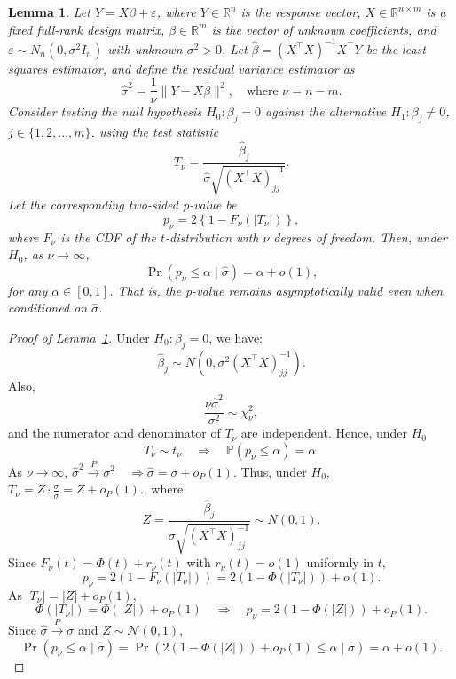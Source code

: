 \documentclass[10pt,a4paper]{amsart}
\newtheorem{lemma}{Lemma}
\begin{document}
\begin{lemma}
\label{lem:asymptotic_pval}
Let $Y=X\beta+\varepsilon$, where $Y\in \mathbb{R}^n$ is the response vector, $X \in \mathbb{R}^{n \times m}$ is a fixed full-rank design matrix, $\beta \in \mathbb{R}^m$ is the vector of unknown coefficients, and $\varepsilon \sim N_n(0, \sigma^2 I_n)$ with unknown $\sigma^2 > 0$. Let $\hat{\beta} = (X^\top X)^{-1}X^\top Y$ be the least squares estimator, and define the residual variance estimator as
\[
\hat{\sigma}^2 = \frac{1}{\nu} \|Y - X\hat{\beta}\|^2, \quad \text{where } \nu = n - m.
\]
Consider testing the null hypothesis $H_0: \beta_j = 0$ against the alternative $H_1: \beta_j \neq 0$, $j\in \{1,2,...,m\}$, using the test statistic
\[
T_\nu = \frac{\hat{\beta}_j}{\hat{\sigma} \sqrt{(X^\top X)^{-1}_{jj}}}.
\]
Let the corresponding two-sided \textit{p}-value be
\[
p_\nu = 2\left\{1 - F_\nu\left(|T_\nu|\right)\right\},
\]
where $F_\nu$ is the CDF of the $t$-distribution with $\nu$ degrees of freedom. Then, under $H_0$, as $\nu \to \infty$,
\[
\Pr(p_\nu \leq \alpha \mid \hat{\sigma}) = \alpha + o(1),
\]
for any $\alpha \in [0, 1]$. That is, the \textit{p}-value remains asymptotically valid even when conditioned on $\hat{\sigma}$.
\end{lemma}

\begin{proof}[Proof of Lemma~\ref{lem:asymptotic_pval}]

Under $H_0: \beta_j = 0$, we have:
\[
\hat{\beta}_j \sim N\left(0, \sigma^2 (X^\top X)^{-1}_{jj}\right).
\]
Also,
\[
\frac{\nu \hat{\sigma}^2}{\sigma^2} \sim \chi^2_\nu,
\]
and the numerator and denominator of $T_\nu$ are independent. Hence, under $H_0$
\[
T_\nu \sim t_\nu \quad \Rightarrow \quad \mathbb{P}(p_\nu \leq \alpha) = \alpha.
\]
As $\nu \to \infty$, 
\(
\hat{\sigma}^2 \xrightarrow{P} \sigma^2 \quad \Rightarrow \hat{\sigma} = \sigma + o_P(1)
\).
Thus, under $H_0$, \(
T_\nu = Z \cdot \frac{\sigma}{\hat{\sigma}} = Z + o_P(1).
\), where
\[
Z = \frac{\hat{\beta}_j}{\sigma \sqrt{(X^\top X)^{-1}_{jj}}} \sim N(0,1).
\]
Since $F_\nu(t) = \Phi(t) + r_\nu(t)$ with $r_\nu(t) = o(1)$ uniformly in $t$,
\[
p_\nu = 2(1 - F_\nu(|T_\nu|)) = 2(1 - \Phi(|T_\nu|)) + o(1).
\]
As $|T_\nu| = |Z| + o_P(1)$,
\[
\Phi(|T_\nu|) = \Phi(|Z|) + o_P(1) \quad \Rightarrow \quad p_\nu = 2(1 - \Phi(|Z|)) + o_P(1).
\]
Since $\hat{\sigma} \xrightarrow{P} \sigma$ and $Z \sim \mathcal{N}(0,1)$,
\[
\Pr(p_\nu \leq \alpha \mid \hat{\sigma}) = \Pr(2(1 - \Phi(|Z|)) + o_P(1) \leq \alpha \mid \hat{\sigma}) = \alpha + o(1).
\]
\end{proof}
\end{document}
